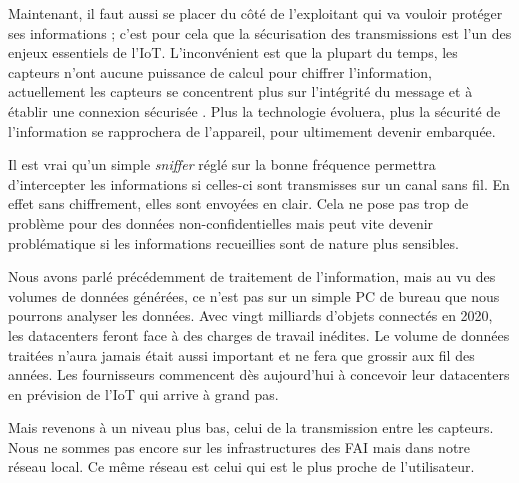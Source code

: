 
Maintenant, il faut aussi se placer du côté de l'exploitant qui va vouloir protéger ses informations ; c'est pour cela que la sécurisation des transmissions est l'un des enjeux essentiels de l'IoT. L'inconvénient est que la plupart du temps, les capteurs n'ont aucune puissance de calcul pour chiffrer l'information, actuellement les capteurs se concentrent plus sur l'intégrité du message et à établir une connexion sécurisée . Plus la technologie évoluera, plus la sécurité de l'information se rapprochera de l'appareil, pour ultimement devenir embarquée. 

Il est vrai qu'un simple \textit{sniffer} réglé sur la bonne fréquence permettra d’intercepter les informations si celles-ci sont transmisses sur un canal sans fil. En effet sans chiffrement, elles sont envoyées en clair. Cela ne pose pas trop de problème pour des données non-confidentielles mais peut vite devenir problématique si les informations recueillies sont de nature plus sensibles.


Nous avons parlé précédemment de traitement de l'information, mais au vu des volumes de données générées, ce n'est pas sur un simple PC de bureau que nous pourrons analyser les données. Avec vingt milliards d'objets connectés en 2020, les datacenters feront face à des charges de travail inédites. Le volume de données traitées n'aura jamais était aussi important et ne fera que grossir aux fil des années. Les fournisseurs commencent dès aujourd'hui à concevoir leur datacenters en prévision de l'IoT qui arrive à grand pas.

Mais revenons à un niveau plus bas, celui de la transmission entre les capteurs. Nous ne sommes pas encore sur les infrastructures des FAI mais dans notre réseau local. Ce même réseau est celui qui est le plus proche de l'utilisateur. 
